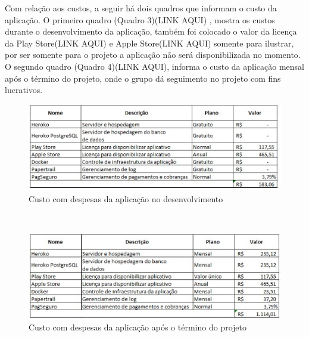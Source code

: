 Com relação aos custos, a seguir há dois quadros que informam o custo da aplicação. O primeiro quadro (Quadro 3)(LINK AQUI) , mostra os custos durante o desenvolvimento da aplicação, também foi colocado o valor da licença da Play Store(LINK AQUI) e Apple Store(LINK AQUI) somente para ilustrar, por ser somente para o projeto a aplicação não será disponibilizada no momento.\\
O segundo quadro (Quadro 4)(LINK AQUI), informa o custo da aplicação mensal após o término do projeto, onde o grupo dá seguimento no projeto com fins lucrativos.

\newpage
\begin{figure}
    \centering
    \includegraphics{exemplos/diagramas/Custo com despesas da aplicação no desenvolvimento.jpeg}
    \caption{Custo com despesas da aplicação no desenvolvimento}
    \label{fig:Custo com despesas da aplicação no desenvolvimento}
\end{figure}\\

\begin{figure}
    \centering
    \includegraphics{exemplos/diagramas/Custo com despesas da aplicação após o término do projeto.jpeg}
    \caption{Custo com despesas da aplicação após o término do projeto}
    \label{fig:Custo com despesas da aplicação após o término do projeto}
\end{figure}

